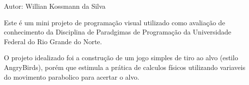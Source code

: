 Autor\+: Willian Kossmann da Silva

Este é um mini projeto de programação visual utilizado como avaliação de conhecimento da Disciplina de Paradgimas de Programação da Universidade Federal do Rio Grande do Norte.

O projeto idealizado foi a construção de um jogo simples de tiro ao alvo (estilo Angry\+Birds), porém que estimula a prática de calculos físicos utilizando variaveis do movimento parabolico para acertar o alvo. 